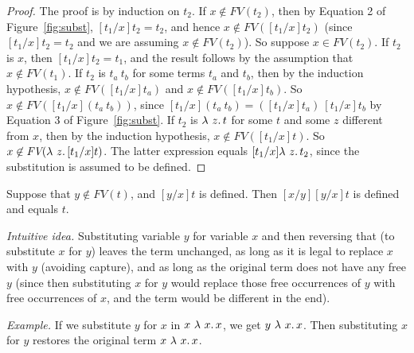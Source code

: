 \begin{proof} The proof is by induction on $t_2$.
  If $x\not\in\textit{FV}(t_2)$, then by Equation 2 of Figure~\ref{fig:subst}, $[t_1/x]t_2 = t_2$, and
  hence $x\not\in\textit{FV}([t_1/x]t_2)$ (since $[t_1/x]t_2 = t_2$ and we are assuming $x\not\in\textit{FV}(t_2)$).
  So suppose $x\in\textit{FV}(t_2)$. If $t_2$ is $x$, then $[t_1/x]t_2 = t_1$,
  and the result follows by the assumption that $x\not\in\textit{FV}(t_1)$.
  If $t_2$ is $t_a\ t_b$ for some terms $t_a$ and $t_b$,
  then by the induction hypothesis, $x\not\in\textit{FV}([t_1/x]t_a)$ and $x\not\in\textit{FV}([t_1/x]t_b)$.
  So $x\not\in\textit{FV}([t_1/x](t_a\ t_b))$, since $[t_1/x](t_a\ t_b) = ([t_1/x]t_a)\ [t_1/x]t_b$ by Equation 3 of Figure~\ref{fig:subst}.
  If $t_2$ is $\lambda\ z.\, t$ for some $t$ and some $z$ different from $x$,
  then by the induction hypothesis, $x\not\in\textit{FV}([t_1/x]t)$.  So $x\not\in\textit{FV}(\lambda\ z.\, [t_1/x]t)$.  The
  latter expression
    equals $[t_1/x]\lambda\ z.\, t_2$, since the substitution is assumed to be defined.
\end{proof}


\begin{lemma}
\label{lem:substundo}
  Suppose that $y\not\in\textit{FV}(t)$, and $[y/x]t$ is defined.  Then
  $[x/y][y/x]t$ is defined and equals $t$.
\end{lemma}

\noindent\textit{Intuitive idea.} Substituting variable $y$ for
variable $x$ and then reversing that (to substitute $x$ for $y$)
leaves the term unchanged, as long as it is legal to replace $x$ with
$y$ (avoiding capture), and as long as the original term does not have any free $y$ (since then substituting $x$ for $y$ would replace those free occurrences of $y$ with free occurrences of $x$, and the term would be different in the end).

\vspace{.2cm}

\noindent\textit{Example.} If we substitute $y$ for $x$ in $x\ \lam{x}{x}$, we get $y\ \lambda\ x.\, x$.  Then substituting $x$ for
$y$ restores the original term $x\ \lam{x}{x}$.

